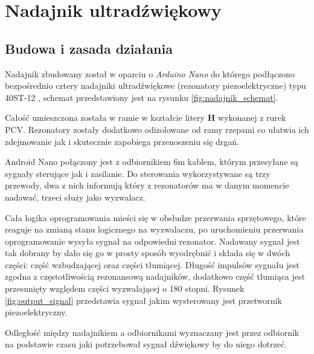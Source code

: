\chapter{Nadajnik ultradźwiękowy}
\section{Budowa i zasada działania}

Nadajnik zbudowany został w oparciu o \textit{Arduino Nano} \cite{bib:arduinoNano} do którego podłączono 
bezpośrednio cztery nadajniki ultradźwiękowe (rezonatory piezoelektryczne) typu 40ST-12 \cite{bib:40ST12}, schemat 
przedstawiony jest na rysunku \ref{fig:nadajnik_schemat}.



Całość umieszczona została w ramie w kształcie litery \textbf{H} wykonanej z rurek PCV.
Rezonatory zostały dodatkowo odizolowane od ramy rzepami co ułatwia ich zdejmowanie jak i skutecznie
zapobiega przenoszeniu się drgań.



Android Nano połączony jest z odbiornikiem 6m kablem, którym przesyłane są sygnały sterujące jak i zasilanie.
Do sterowania wykorzystywane są trzy przewody, dwa z nich informują który z rezonatorów ma w danym momencie nadawać,
trzeci służy jako wyzwalacz. 

Cała logika oprogramowania mieści się w obsłudze przerwania sprzętowego, które reaguje na zmianą stanu logicznego
na wyzwalaczu,
po uruchomieniu przerwania oprogramowanie wysyła sygnał na odpowiedni rezonator. 
Nadawany sygnał jest tak dobrany by dało się go w prosty sposób wyodrębnić i składa się w dwóch
części: część wzbudzającej oraz części tłumiącej.
Długość impulsów sygnału jest zgodna z częstotliwością rezonansową nadajników, dodatkowo część tłumiąca
jest przesunięty względem części wyzwalającej o 180 stopni.  
Rysunek \ref{fig:output_signal} przedstawia sygnał jakim wysterowany jest przetwornik piezoelektryczny. 

Odległość między nadajnikiem a odbiornikami wyznaczany jest przez odbiornik na podstawie
czasu jaki potrzebował sygnał dźwiękowy by do niego dotrzeć.

